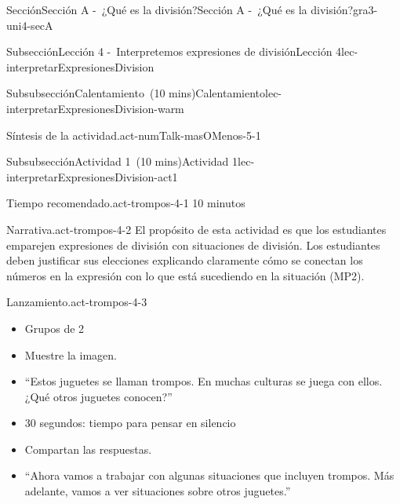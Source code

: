 \documentclass[oneside,10pt,]{article}
\newlength{\fillinmaxwidth}
\newlength{\fillincontract}
\newlength{\charmaxwidth}\setlength{\charmaxwidth}{0.5em}
\newlength{\charminwidth}\setlength{\charminwidth}{0.1em}
\newlength{\fillinheight}
\newcommand{\fillintext}[1]{%
\setlength{\fillinmaxwidth}{#1\charmaxwidth}%
\setlength{\fillincontract}{#1\charminwidth}%
\setlength{\fillinheight}{\baselineskip}\addtolength{\fillinheight}{1.2pt}%
\strut\nobreak\leaders\vbox{\hrule width 0.3pt height 0.3pt \vskip -1.2pt}\hskip 1\fillinmaxwidth minus \fillincontract\nobreak\strut%
}
\begin{document}
\begin{sectionptx}{Sección}{Sección A -~¿Qué es la división?}{}{Sección A -~¿Qué es la división?}{}{}{gra3-uni4-secA}
\begin{subsectionptx}{Subsección}{Lección 4 -~Interpretemos expresiones de división}{}{Lección 4}{}{}{lec-interpretarExpresionesDivision}
\begin{subsubsectionptx}{Subsubsección}{Calentamiento~(10 mins)}{}{Calentamiento}{}{}{lec-interpretarExpresionesDivision-warm}
\begin{paragraphs}{Síntesis de la actividad.}{act-numTalk-masOMenos-5-1}
\begin{itemize}[label=\textbullet]
%
\end{itemize}
\end{paragraphs}%
\end{subsubsectionptx}
%
%
\typeout{************************************************}
\typeout{************************************************}
%
\begin{subsubsectionptx}{Subsubsección}{Actividad 1~(10 mins)}{}{Actividad 1}{}{}{lec-interpretarExpresionesDivision-act1}
\par
\begin{paragraphs}{Tiempo recomendado.}{act-trompos-4-1}%
10 minutos%
\end{paragraphs}%
\begin{paragraphs}{Narrativa.}{act-trompos-4-2}%
El propósito de esta actividad es que los estudiantes emparejen expresiones de división con situaciones de división. Los estudiantes deben justificar sus elecciones explicando claramente cómo se conectan los números en la expresión con lo que está sucediendo en la situación (MP2).%
\end{paragraphs}%
\begin{paragraphs}{Lanzamiento.}{act-trompos-4-3}%
%
\begin{itemize}[label=\textbullet]
\item{}Grupos de 2%
\item{}Muestre la imagen.%
\item{}``Estos juguetes se llaman trompos. En muchas culturas se juega con ellos. ¿Qué otros juguetes conocen?''%
\item{}30 segundos: tiempo para pensar en silencio%
\item{}Compartan las respuestas.%
\item{}``Ahora vamos a trabajar con algunas situaciones que incluyen trompos. Más adelante, vamos a ver situaciones sobre otros juguetes.''%
\end{itemize}
\end{paragraphs}%

\end{subsubsectionptx}
\end{subsectionptx}
\end{sectionptx}
\end{document}
